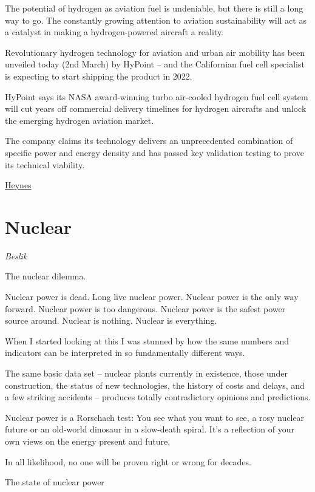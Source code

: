 \documentclass[
]{book}
\begin{document}
The potential of hydrogen as aviation fuel is undeniable, but there is still a long way to go. The constantly growing attention to aviation sustainability will act as a catalyst in making a hydrogen-powered aircraft a reality.

Revolutionary hydrogen technology for aviation and urban air mobility has been unveiled today (2nd March) by HyPoint -- and the Californian fuel cell specialist is expecting to start shipping the product in 2022.

HyPoint says its NASA award-winning turbo air-cooled hydrogen fuel cell system will cut years off commercial delivery timelines for hydrogen aircrafts and unlock the emerging hydrogen aviation market.

The company claims its technology delivers an unprecedented combination of specific power and energy density and has passed key validation testing to prove its technical viability.

\href{https://www.h2-view.com/story/hydrogen-aviation-projected-to-be-worth-174bn-by-2040/}{Heynes}

\hypertarget{nuclear}{%
\chapter{Nuclear}\label{nuclear}}

\emph{Beslik}

The nuclear dilemma.

Nuclear power is dead. Long live nuclear power. Nuclear power is the only way forward. Nuclear power is too dangerous. Nuclear power is the safest power source around. Nuclear is nothing. Nuclear is everything.

When I started looking at this I was stunned by how the same numbers and indicators can be interpreted in so fundamentally different ways.

The same basic data set -- nuclear plants currently in existence, those under construction, the status of new technologies, the history of costs and delays, and a few striking accidents -- produces totally contradictory opinions and predictions.

Nuclear power is a Rorschach test: You see what you want to see, a rosy nuclear future or an old-world dinosaur in a slow-death spiral. It's a reflection of your own views on the energy present and future.

In all likelihood, no one will be proven right or wrong for decades.

The state of nuclear power
\end{document}
